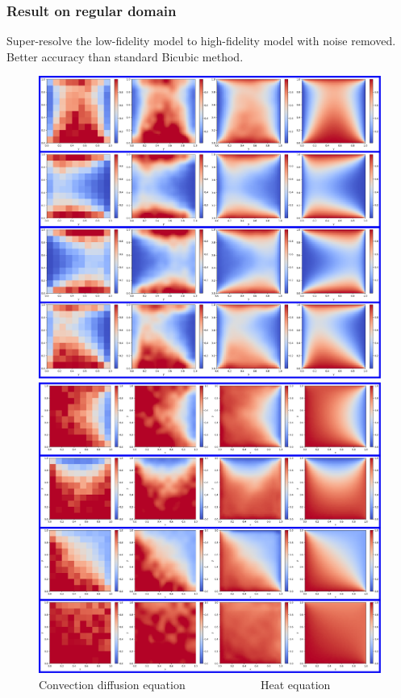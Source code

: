 \documentclass{beamer}
\begin{document}
\begin{frame}
\frametitle{Result on regular domain}
Super-resolve the low-fidelity model to high-fidelity model with noise removed.
Better accuracy than standard Bicubic method.
\begin{figure}
	\includegraphics[height=0.4\textwidth]{covecdiffpdf.pdf}
	\includegraphics[height=0.4\textwidth]{Heat.png}
Convection diffusion equation     $\quad\quad\quad\quad\quad\quad$        Heat equation
\end{figure}
\end{frame}
\end{document}
